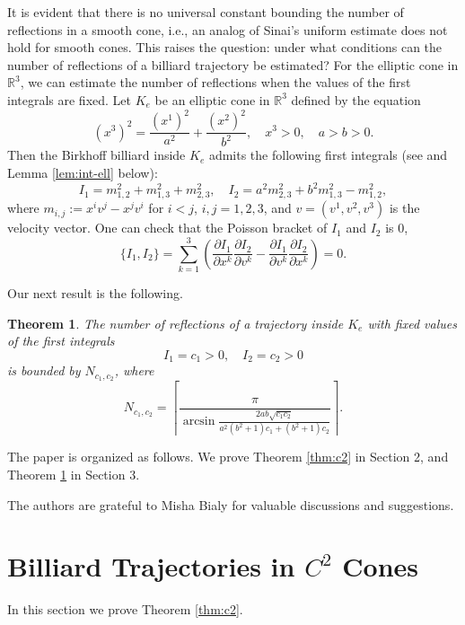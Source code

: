 \documentclass[12pt]{article}
\newtheorem{theorem}{Theorem}
\begin{document}
It is evident that there is no universal constant bounding the number of reflections in a smooth cone, i.e., an analog of Sinai's uniform estimate does not hold for smooth cones.
This raises the question: under what conditions can the number of reflections of a billiard trajectory be estimated?
For the elliptic cone in ${\mathbb R}^3$, we can estimate the number of reflections when the values of the first integrals are fixed. 
Let $K_e$ be an elliptic cone in $\mathbb{R}^3$ defined by the equation  
\begin{equation}\label{eq:elliptic-cone}
(x^3)^2 = \frac{(x^1)^2}{a^2} + \frac{(x^2)^2}{b^2}, \quad x^3 > 0, \quad a>b>0.
\end{equation}  
Then the Birkhoff billiard inside $K_e$ admits the following first integrals (see \cite{MY} and Lemma \ref{lem:int-ell} below):  
$$
I_1 = 
m_{1,2}^2 + m_{1,3}^2 + m_{2,3}^2,
\quad 
I_2 = 
a^2 m_{2,3}^2 + b^2 m_{1,3}^2 - m_{1,2}^2,
$$
where $m_{i,j} := x^i v^j - x^j v^i$ for $i < j$, $i, j = 1, 2, 3$, and ${v} = (v^1, v^2, v^3)$ is the velocity vector.
One can check that the Poisson bracket of $I_1$ and $I_2$ is $0$,
$$
 \{I_1,I_2\}=\sum_{k=1}^3
 \left(
  \frac{\partial I_1}{\partial x^k}\frac{\partial I_2}{\partial v^k}-
 \frac{\partial I_1}{\partial v^k}\frac{\partial I_2}{\partial x^k}\right)=0.
$$

Our next result is the following.
  
\begin{theorem}\label{thm:elliptic} 
    The number of reflections of a trajectory inside $K_e$ with fixed values of the first integrals
    \begin{equation}\label{eq:i-c}
      I_1 = c_1>0 , \quad I_2 = c_2>0
    \end{equation}
    is bounded by $N_{c_1,c_2}$, where
    $$
    N_{c_1,c_2} = \left\lceil 
    \frac{\pi}
    {\arcsin 
    \frac{2 a b \sqrt{c_1 c_2}}
    {a^2(b^2+1)c_1 + (b^2+1)c_2}
    } 
    \right\rceil.
    $$
  \end{theorem}

  
  The paper is organized as follows. 
  We prove Theorem \ref{thm:c2} in Section 2, and Theorem \ref{thm:elliptic} in Section 3.
  

  The authors are grateful to Misha Bialy for valuable discussions and suggestions.

\section{Billiard Trajectories in $C^2$ Cones}
In this section we prove Theorem \ref{thm:c2}.
\end{document}
